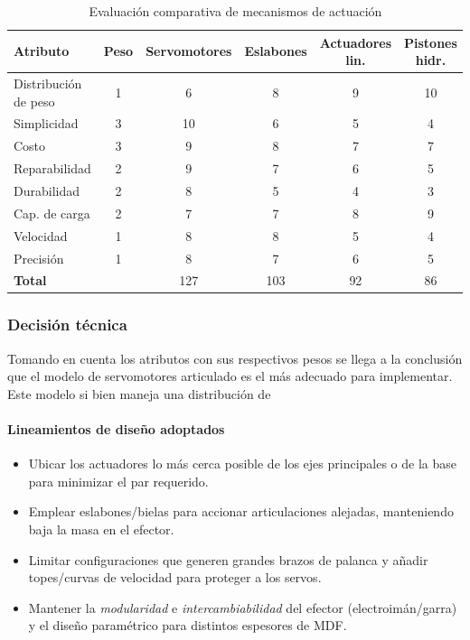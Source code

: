 \begin{table}[H]
\centering
\caption{Evaluación comparativa de mecanismos de actuación}
\begin{tabular}{lccccc}
\toprule
\textbf{Atributo} & \textbf{Peso} & \textbf{Servomotores} & \textbf{Eslabones} & \textbf{Actuadores lin.} & \textbf{Pistones hidr.} \\
\midrule
Distribución de peso & 1 & 6  & 8  & 9 & 10 \\
Simplicidad          & 3 & 10 & 6  & 5 & 4  \\
Costo                & 3 & 9  & 8  & 7 & 7  \\
Reparabilidad        & 2 & 9  & 7  & 6 & 5  \\
Durabilidad          & 2 & 8  & 5  & 4 & 3  \\
Cap. de carga        & 2 & 7  & 7  & 8 & 9  \\
Velocidad            & 1 & 8  & 8  & 5 & 4  \\
Precisión            & 1 & 8  & 7  & 6 & 5  \\
\midrule
\textbf{Total}       &    & 127 & 103 & 92 & 86 \\
\bottomrule
\end{tabular}
\end{table}


\subsubsection*{Decisión técnica}
Tomando en cuenta los atributos con sus respectivos pesos se llega a la conclusión que el modelo de servomotores articulado es el más adecuado para implementar. Este modelo si bien maneja una distribución de 

\paragraph{Lineamientos de diseño adoptados}
\begin{itemize}
  \item Ubicar los actuadores lo más cerca posible de los ejes principales o de la base para minimizar el par requerido.
  \item Emplear eslabones/bielas para accionar articulaciones alejadas, manteniendo baja la masa en el efector.
  \item Limitar configuraciones que generen grandes brazos de palanca y añadir topes/curvas de velocidad para proteger a los servos.
  \item Mantener la \emph{modularidad} e \emph{intercambiabilidad} del efector (electroimán/garra) y el diseño paramétrico para distintos espesores de MDF.\@
\end{itemize}


